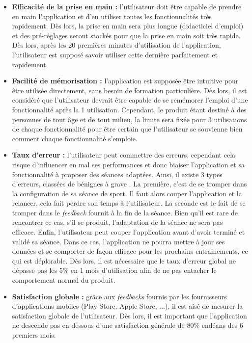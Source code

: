 \begin{itemize}
	\item \textbf{Efficacité de la prise en main :} l'utilisateur doit être capable de prendre en main l'application et d'en utiliser toutes les fonctionnalités très rapidement. Dès lors, la prise en main sera plus longue (didacticiel d'emploi) et des pré-réglages seront stockés pour que la prise en main soit très rapide. Dès lors, après les 20 premières minutes d'utilisation de l'application, l'utilisateur est supposé savoir utiliser cette dernière parfaitement et rapidement.\\
	
	\item \textbf{Facilité de mémorisation :} l'application est supposée être intuitive pour être utilisée directement, sans besoin de formation particulière. Dès lors, il est considéré que l'utilisateur devrait être capable de se remémorer l'emploi d'une fonctionnalité après la 1\iere{} utilisation. Cependant, le produit étant destiné à des personnes de tout âge et de tout milieu, la limite sera fixée pour 3 utilisations de chaque fonctionnalité pour être certain que l'utilisateur se souvienne bien comment chaque fonctionnalité s'emploie.\\
	
	\item \textbf{Taux d'erreur :} l'utilisateur peut commettre des erreurs, cependant cela risque d'influencer en mal ses performances et donc biaiser l'application et sa fonctionnalité à proposer des séances adaptées. Ainsi, il existe 3 types d'erreurs, classées de bénignes à \og grave \fg{}. La première, c'est de se tromper dans la configuration de sa séance de sport. Il faut alors couper l'application et la relancer, cela fait perdre son temps à l'utilisateur. La seconde est le fait de se tromper dans le \textit{feedback} fournit à la fin de la séance. Bien qu'il est rare de rencontrer ce cas, s'il se produit, l'adaptation de la séance ne sera pas efficace. Enfin, l'utilisateur peut couper l'application avant d'avoir terminé et validé sa séance. Dans ce cas, l'application ne pourra mettre à jour ses données et se comporter de façon efficace pour les prochains entrainements, ce qui est déplorable. Dès lors, il est nécessaire que le taux d'erreur global ne dépasse pas les 5\% en 1 mois d'utilisation afin de ne pas entacher le comportement normal du produit.\\
	
	\item \textbf{Satisfaction globale :} grâce aux \textit{feedbacks} fournis par les fournisseurs d'applications mobiles (Play Store, Apple Store, ...), il est aisé de mesurer la satisfaction globale de l'utilisateur. Dès lors, il est important que l'application ne descende pas en dessous d'une satisfaction générale de 80\% endéans des 6 premiers mois.
\end{itemize}

